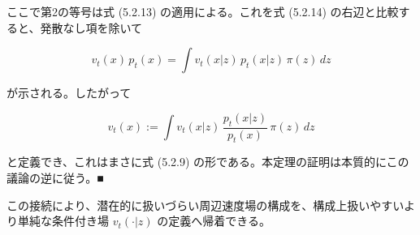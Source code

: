 ここで第2の等号は式 (5.2.13) の適用による。これを式 (5.2.14) の右辺と比較すると、発散なし項を除いて

\[
v_t(x)\,p_t(x)=\int v_t(x|z)\,p_t(x|z)\,\pi(z)\,dz
\]


が示される。したがって

\[
v_t(x):=\int v_t(x|z)\,\frac{p_t(x|z)}{p_t(x)}\,\pi(z)\,dz
\]


と定義でき、これはまさに式 (5.2.9) の形である。本定理の証明は本質的にこの議論の逆に従う。■

この接続により、潜在的に扱いづらい周辺速度場の構成を、構成上扱いやすいより単純な条件付き場 $v_t(\cdot|z)$ の定義へ帰着できる。

